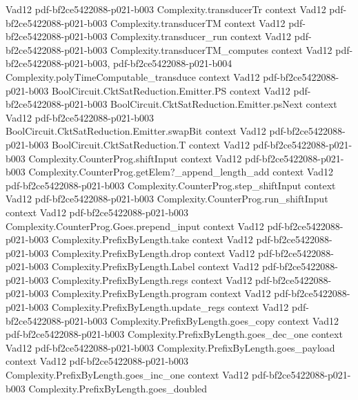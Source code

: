 \begin{theorem}
  {Vad12}
  {pdf-bf2ce5422088-p021-b003}
\proofstep
  {Complexity.transducerTr}
  {context}
  {Vad12}
  {pdf-bf2ce5422088-p021-b003}
\proofstep
  {Complexity.transducerTM}
  {context}
  {Vad12}
  {pdf-bf2ce5422088-p021-b003}
\proofstep
  {Complexity.transducer_run}
  {context}
  {Vad12}
  {pdf-bf2ce5422088-p021-b003}
\proofstep
  {Complexity.transducerTM_computes}
  {context}
  {Vad12}
  {pdf-bf2ce5422088-p021-b003,
    pdf-bf2ce5422088-p021-b004}
\proofstep
  {Complexity.polyTimeComputable_transduce}
  {context}
  {Vad12}
  {pdf-bf2ce5422088-p021-b003}
\proofstep
  {BoolCircuit.CktSatReduction.Emitter.PS}
  {context}
  {Vad12}
  {pdf-bf2ce5422088-p021-b003}
\proofstep
  {BoolCircuit.CktSatReduction.Emitter.psNext}
  {context}
  {Vad12}
  {pdf-bf2ce5422088-p021-b003}
\proofstep
  {BoolCircuit.CktSatReduction.Emitter.swapBit}
  {context}
  {Vad12}
  {pdf-bf2ce5422088-p021-b003}
\proofstep
  {BoolCircuit.CktSatReduction.T}
  {context}
  {Vad12}
  {pdf-bf2ce5422088-p021-b003}
\proofstep
  {Complexity.CounterProg.shiftInput}
  {context}
  {Vad12}
  {pdf-bf2ce5422088-p021-b003}
\proofstep
  {Complexity.CounterProg.getElem?_append_length_add}
  {context}
  {Vad12}
  {pdf-bf2ce5422088-p021-b003}
\proofstep
  {Complexity.CounterProg.step_shiftInput}
  {context}
  {Vad12}
  {pdf-bf2ce5422088-p021-b003}
\proofstep
  {Complexity.CounterProg.run_shiftInput}
  {context}
  {Vad12}
  {pdf-bf2ce5422088-p021-b003}
\proofstep
  {Complexity.CounterProg.Goes.prepend_input}
  {context}
  {Vad12}
  {pdf-bf2ce5422088-p021-b003}
\proofstep
  {Complexity.PrefixByLength.take}
  {context}
  {Vad12}
  {pdf-bf2ce5422088-p021-b003}
\proofstep
  {Complexity.PrefixByLength.drop}
  {context}
  {Vad12}
  {pdf-bf2ce5422088-p021-b003}
\proofstep
  {Complexity.PrefixByLength.Label}
  {context}
  {Vad12}
  {pdf-bf2ce5422088-p021-b003}
\proofstep
  {Complexity.PrefixByLength.regs}
  {context}
  {Vad12}
  {pdf-bf2ce5422088-p021-b003}
\proofstep
  {Complexity.PrefixByLength.program}
  {context}
  {Vad12}
  {pdf-bf2ce5422088-p021-b003}
\proofstep
  {Complexity.PrefixByLength.update_regs}
  {context}
  {Vad12}
  {pdf-bf2ce5422088-p021-b003}
\proofstep
  {Complexity.PrefixByLength.goes_copy}
  {context}
  {Vad12}
  {pdf-bf2ce5422088-p021-b003}
\proofstep
  {Complexity.PrefixByLength.goes_dec_one}
  {context}
  {Vad12}
  {pdf-bf2ce5422088-p021-b003}
\proofstep
  {Complexity.PrefixByLength.goes_payload}
  {context}
  {Vad12}
  {pdf-bf2ce5422088-p021-b003}
\proofstep
  {Complexity.PrefixByLength.goes_inc_one}
  {context}
  {Vad12}
  {pdf-bf2ce5422088-p021-b003}
\proofstep
  {Complexity.PrefixByLength.goes_doubled}

\end{theorem}
